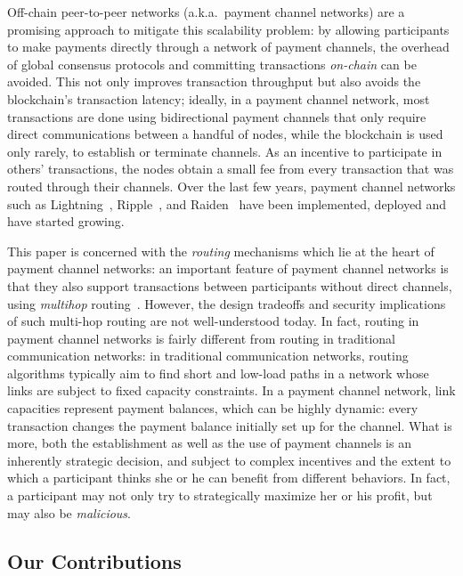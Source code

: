 Off-chain peer-to-peer networks (a.k.a.~payment channel networks) 
are a promising approach to mitigate
this scalability problem: by allowing participants to 
make payments directly through a network of payment channels,
the overhead of global consensus protocols and committing transactions \emph{on-chain} 
can be avoided.
This not only improves transaction throughput
but also avoids the blockchain's transaction latency;
ideally, in a payment channel network, most transactions are done using bidirectional payment
channels that only require direct communications between a handful of nodes, while the blockchain is used only rarely, to establish or terminate channels. 
As an incentive to participate in others' transactions, the nodes obtain a small fee from every transaction that was routed through their channels.
Over the last few years, payment channel networks such as Lightning~\cite{poon2016bitcoin}, Ripple~\cite{armknecht2015ripple}, and Raiden~\cite{network2018cheap}
have been implemented, deployed and have started growing.

This paper is concerned with the \emph{routing} mechanisms which lie at the heart
of payment channel networks:
an important feature of payment channel networks is that they
also support transactions between participants without direct channels, 
using \emph{multihop} routing~\cite{malavolta2019anonymous,poon2016bitcoin}.
However, the design tradeoffs and security implications of such multi-hop routing
are not well-understood today.
In fact, routing in payment channel networks is 
fairly different from routing in traditional communication networks: 
in traditional communication networks, routing algorithms typically
aim to find short and low-load paths in a network whose links are subject
to fixed capacity constraints. In a payment channel network, 
link capacities represent
payment balances, which can be highly dynamic: every transaction changes the payment balance initially
set up for the channel. 
What is more, both the establishment as well as the use of payment
channels is an inherently strategic decision, and subject to complex
incentives and the extent to which a participant thinks she or he can benefit from
different behaviors. 
In fact, a participant may not only try to strategically maximize her or his
profit, but may also be \emph{malicious}.

\subsection{Our Contributions}

